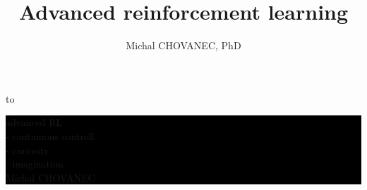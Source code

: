 \documentclass[xcolor=dvipsnames]{beamer}
\title{\color{white} \bf Advanced reinforcement learning}
\author{\color{white} Michal CHOVANEC, PhD}
\date[EURP]{}
\begin{document}
{
    \usebackgroundtemplate
    {
        \vbox to 
    }



    \begin{frame}

    \centering
     \colorbox{black}
     {
        \begin{minipage}{7cm}
           {\LARGE \color{white} advanced RL} \\
           {\Large \color{white} - continuous controll \\- curiosity \\- imagination} \\
           {\LARGE \color{white} Michal CHOVANEC} \\
       \end{minipage}
     }

    \end{frame}
}
\end{document}

